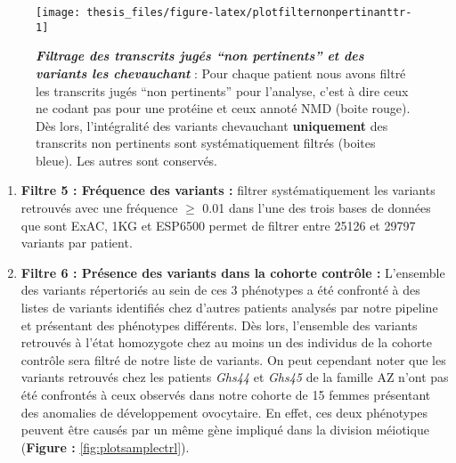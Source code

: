 \documentclass[12pt,a4paper,twoside]{ugathesis}
\begin{document}
\begin{figure}

{\centering \texttt{[image: thesis\_files/figure-latex/plotfilternonpertinanttr-1]} 

}

\caption[Filtrage des transcrits jugés "non pertinents" et des variants les chevauchant]{\textbf{\emph{Filtrage des transcrits
jugés ``non pertinents'' et des variants les chevauchant}} : Pour chaque
patient nous avons filtré les transcrits jugés ``non pertinents'' pour
l'analyse, c'est à dire ceux ne codant pas pour une protéine et ceux
annoté NMD (boite rouge). Dès lors, l'intégralité des variants
chevauchant \textbf{uniquement} des transcrits non pertinents sont
systématiquement filtrés (boites bleue). Les autres sont conservés.}\label{fig:plotfilternonpertinanttr}
\end{figure}









\begin{enumerate}
\def\labelenumi{\arabic{enumi}.}
\setcounter{enumi}{4}
\item
  \textbf{Filtre 5 : Fréquence des variants :} filtrer systématiquement
  les variants retrouvés avec une fréquence \(\ge\) 0.01 dans l'une des
  trois bases de données que sont ExAC, 1KG et ESP6500 permet de filtrer
  entre 25126 et 29797 variants par patient.
\item
  \textbf{Filtre 6 : Présence des variants dans la cohorte contrôle :}
  L'ensemble des variants répertoriés au sein de ces 3 phénotypes a été
  confronté à des listes de variants identifiés chez d'autres patients
  analysés par notre pipeline et présentant des phénotypes différents.
  Dès lors, l'ensemble des variants retrouvés à l'état homozygote chez
  au moins un des individus de la cohorte contrôle sera filtré de notre
  liste de variants. On peut cependant noter que les variants retrouvés
  chez les patients \emph{Ghs44} et \emph{Ghs45} de la famille AZ n'ont
  pas été confrontés à ceux observés dans notre cohorte de 15 femmes
  présentant des anomalies de développement ovocytaire. En effet, ces
  deux phénotypes peuvent être causés par un même gène impliqué dans la
  division méiotique (\textbf{Figure :} \ref{fig:plotsamplectrl}).\\
  \newpage
\end{enumerate}
\end{document}
